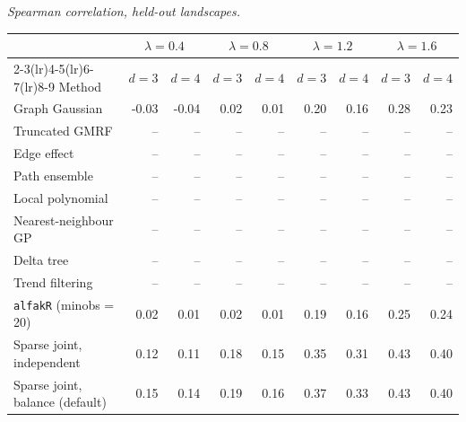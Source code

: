 \par\medskip\noindent\begin{minipage}{\linewidth}
\textit{Spearman correlation, held-out landscapes.}
\begin{center}
\footnotesize
\setlength{\tabcolsep}{3.5pt}
\begin{tabular}{l*{8}{r}}
\toprule
 & \multicolumn{2}{c}{$\lambda=0.4$} & \multicolumn{2}{c}{$\lambda=0.8$} & \multicolumn{2}{c}{$\lambda=1.2$} & \multicolumn{2}{c}{$\lambda=1.6$} \\
\cmidrule(lr){2-3}\cmidrule(lr){4-5}\cmidrule(lr){6-7}\cmidrule(lr){8-9}
Method & $d=3$ & $d=4$ & $d=3$ & $d=4$ & $d=3$ & $d=4$ & $d=3$ & $d=4$ \\
\midrule
Graph Gaussian & -0.03 & -0.04 & 0.02 & 0.01 & 0.20 & 0.16 & 0.28 & 0.23 \\
Truncated GMRF & -- & -- & -- & -- & -- & -- & -- & -- \\
Edge effect & -- & -- & -- & -- & -- & -- & -- & -- \\
Path ensemble & -- & -- & -- & -- & -- & -- & -- & -- \\
Local polynomial & -- & -- & -- & -- & -- & -- & -- & -- \\
Nearest-neighbour GP & -- & -- & -- & -- & -- & -- & -- & -- \\
Delta tree & -- & -- & -- & -- & -- & -- & -- & -- \\
Trend filtering & -- & -- & -- & -- & -- & -- & -- & -- \\
\texttt{alfakR} (minobs = 20) & 0.02 & 0.01 & 0.02 & 0.01 & 0.19 & 0.16 & 0.25 & 0.24 \\
Sparse joint, independent & 0.12 & 0.11 & 0.18 & 0.15 & 0.35 & 0.31 & 0.43 & 0.40 \\
Sparse joint, balance (default) & 0.15 & 0.14 & 0.19 & 0.16 & 0.37 & 0.33 & 0.43 & 0.40 \\
\bottomrule
\end{tabular}
\end{center}
\end{minipage}

